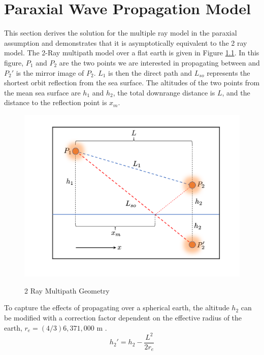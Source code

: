 \chapter{Paraxial Wave Propagation Model}
\label{analytical_propagation}

This section derives the solution for the multiple ray model in the paraxial assumption and demonstrates that it is asymptotically equivalent to the 2 ray model. The 2-Ray multipath model over a flat earth is given in Figure \ref{mp_fig:1}. In this figure, $P_1$ and $P_2$ are the two points we are interested in propagating between and $P_2'$ is the mirror image of $P_2$. $L_1$ is then the direct path and $L_{so}$ represents the shortest orbit reflection from the sea surface. The altitudes of the two points from the mean sea surface are $h_1$ and $h_2$, the total downrange distance is $L$, and the distance to the reflection point is $x_m$.

\begin{figure}[H]
  \begin{center}
\includegraphics[width=5in]{../media/analysis/multipath_2_ray.png}
  \end{center}
  \renewcommand{\baselinestretch}{1} \small\normalsize
  \begin{quote}
    \caption[2 Ray Multipath Geometry]{ 2 Ray Multipath Geometry\label{mp_fig:1}}
  \end{quote}
\end{figure}
\renewcommand{\baselinestretch}{2} \small\normalsize

To capture the effects of propagating over a spherical earth, the altitude $h_2$ can be modified with a correction factor dependent on the effective radius of the earth, $r_e = (4/3) 6,371,000$ m \cite{blake_radar}.
\begin{equation}
h_2' = h_2 - \frac{L^2}{2r_e}
\label{mp_eq:0}
\end{equation}

